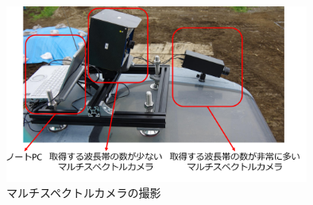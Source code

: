 \begin{figure}[p]
      \begin{center}
            \includegraphics[width=10cm]{./Ch5_ConeIndexEstimation/Fig/spectral_camera_shooting_Ver_2_compressed.pdf}
            \caption{マルチスペクトルカメラの撮影}
            \label{fig:spectral_camera_shooting}
      \end{center}
\end{figure}


